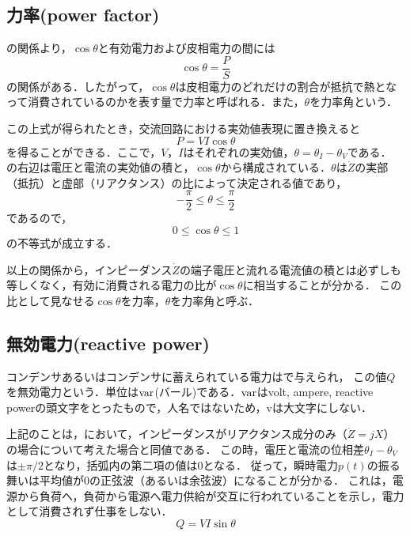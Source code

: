 \subsection{力率(power factor)\cite{11300007922816}}
の関係より，$\cos \theta$と有効電力および皮相電力の間には
\begin{equation}
	\cos \theta =\frac{P}{S}
\end{equation}
の関係がある．したがって，$\cos \theta$は皮相電力のどれだけの割合が抵抗で熱となって消費されているのかを表す量で力率と呼ばれる．また，$\theta$を力率角という．

この上式が得られたとき，交流回路における実効値表現に置き換えると
\begin{equation}
	P = VI\cos\theta
	\label{eq:power}
\end{equation}
を得ることができる．ここで，$V$，$I$はそれぞれの実効値，$\theta=\theta_I-\theta_V$である．
の右辺は電圧と電流の実効値の積と，$\cos\theta$から構成されている．$\theta$は$\dot{Z}$の実部（抵抗）と虚部（リアクタンス）の比によって決定される値であり，
\begin{equation}
	-\frac{\pi}{2}\leq\theta\leq\frac{\pi}{2}
\end{equation}
であるので，
\begin{equation}
	0\leq\cos\theta\leq 1
\end{equation}
の不等式が成立する．

以上の関係から，インピーダンス$\dot{Z}$の端子電圧と流れる電流値の積とは必ずしも等しくなく，有効に消費される電力の比が$\cos\theta$に相当することが分かる．
この比として見なせる$\cos\theta$を力率，$\theta$を力率角と呼ぶ．

\subsection{無効電力(reactive power)\cite{11300007922816}}
コンデンサあるいはコンデンサに蓄えられている電力はで与えられ，
この値$Q$を無効電力という．単位は$\rm{var}$(バール)である．$\rm{var}$はvolt, ampere, reactive powerの頭文字をとったもので，人名ではないため，vは大文字にしない．

上記のことは，において，インピーダンスがリアクタンス成分のみ（$\dot{Z}=jX$）の場合について考えた場合と同値である．
この時，電圧と電流の位相差$\theta_I-\theta_V$は$\pm\pi/2$となり，括弧内の第二項の値は0となる．
従って，瞬時電力$p(t)$の振る舞いは平均値が0の正弦波（あるいは余弦波）になることが分かる．
これは，電源から負荷へ，負荷から電源へ電力供給が交互に行われていることを示し，電力として消費されず仕事をしない．
\begin{equation}
	Q = VI \sin \theta
	\label{eq:mukoh}
\end{equation}

